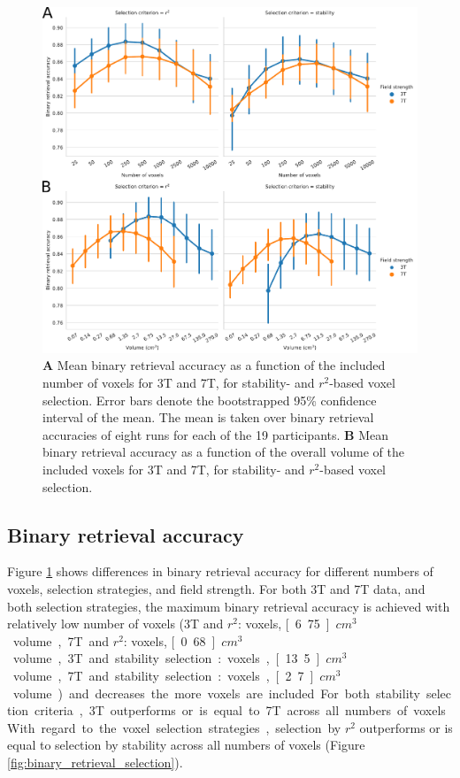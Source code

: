 \begin{figure}
  \centering
  \includegraphics[width=\linewidth]{pics/binary.pdf}
	
  \caption{\textbf{A} Mean binary retrieval accuracy as a function of the
  included number of voxels for 3T and 7T, for stability- and $r^2$-based
  voxel selection. Error bars denote the bootstrapped 95\% confidence interval
  of the mean. The mean is taken over binary retrieval accuracies of eight runs
  for each of the 19 participants. \textbf{B} Mean binary retrieval accuracy as
a function of the overall volume of the included voxels for 3T and 7T, for
stability- and $r^2$-based voxel selection.
}

 \label{fig:binary_retrieval}\end{figure}

\subsection*{Binary retrieval accuracy}

Figure \ref{fig:binary_retrieval} shows differences in binary retrieval accuracy for different numbers of voxels, selection strategies, and field strength.
For both 3T and 7T data, and both selection strategies, the maximum binary retrieval accuracy is achieved with relatively low number of voxels (3T and $r^{2}$: \unit[250]{voxels}, \unit[6.75]{$cm^{3}$} volume, 7T and $r^{2}$: \unit[500]{voxels}, \unit[0.68]{$cm^{3}$} volume, 3T and stability selection: \unit[500]{voxels}, \unit[13.5]{$cm^{3}$} volume, 7T and stability selection: \unit[1000]{voxels}, \unit[2.7]{$cm^{3}$} volume) and decreases the more voxels are included. For both stability selection criteria, 3T outperforms or is equal to 7T across all numbers of voxels. With regard to the voxel selection strategies, selection by $r^{2}$ outperforms or is equal to selection by stability across all numbers of voxels (Figure \ref{fig:binary_retrieval_selection}).

